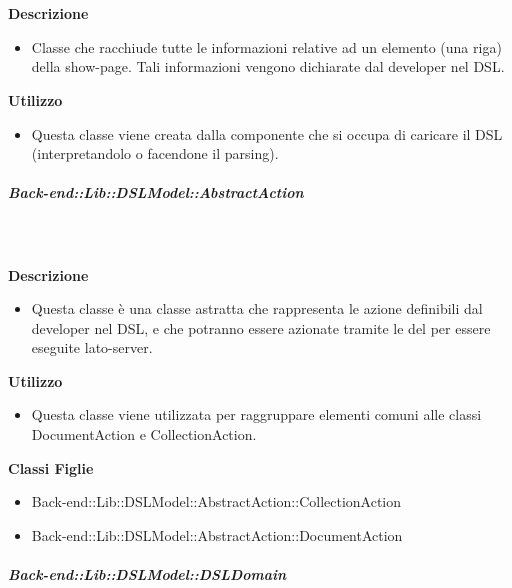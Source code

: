         \textbf{\\ \\ Descrizione} 
          \begin{itemize}
            \item[] Classe che racchiude tutte le informazioni relative ad un elemento (una riga) della show-page. Tali informazioni vengono dichiarate dal developer nel DSL.
          \end{itemize}      
        \textbf{Utilizzo}  
          \begin{itemize}
            \item[] Questa classe viene creata dalla componente che si occupa di caricare il DSL (interpretandolo o facendone il parsing). 
          \end{itemize}
      \subparagraph{Back-end::Lib::DSLModel::AbstractAction}
        
        \textbf{\\ \\ Descrizione} 
          \begin{itemize}
            \item[] Questa classe è una classe astratta che rappresenta le azione definibili dal developer nel DSL, e che potranno essere azionate tramite le  del  per essere eseguite lato-server.
          \end{itemize}      
        \textbf{Utilizzo}  
          \begin{itemize}
            \item[] Questa classe viene utilizzata per raggruppare elementi comuni alle classi DocumentAction e CollectionAction.
          \end{itemize}
          \textbf{Classi Figlie}
          \begin{itemize}
              \item{Back-end::Lib::DSLModel::AbstractAction::CollectionAction}
              \item{Back-end::Lib::DSLModel::AbstractAction::DocumentAction}
          \end{itemize}
      \subparagraph{Back-end::Lib::DSLModel::DSLDomain}
        
